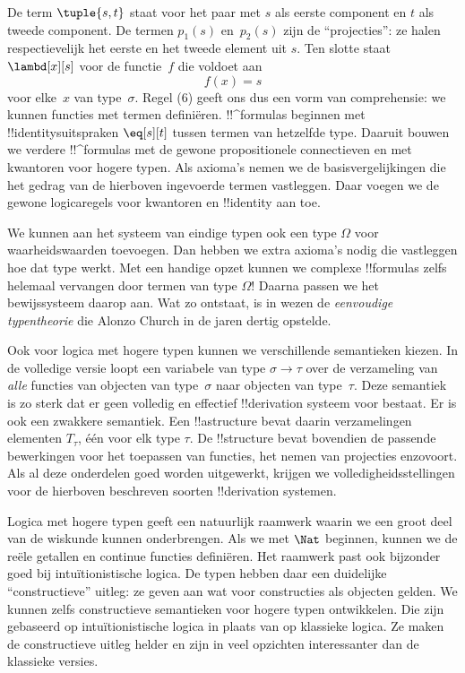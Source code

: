 \documentclass[../../../include/open-logic-section]{subfiles}
\begin{document}
De term $\tuple{s, t}$ staat voor het paar met $s$ als eerste component en
$t$ als tweede component. De termen $p_1(s)$ en~$p_2(s)$ zijn de
``projecties'': ze halen respectievelijk het eerste en het tweede element uit
$s$. Ten slotte staat $\lambd[x][s]$ voor de functie~$f$ die voldoet aan
\[
f(x) = s
\]
voor elke~$x$ van type~$\sigma$. Regel (6) geeft ons dus een vorm van
comprehensie: we kunnen functies met termen definiëren. !!^{formula}s beginnen
met !!{identity}suitspraken $\eq[s][t]$ tussen termen van hetzelfde type.
Daaruit bouwen we verdere !!^{formula}s met de gewone propositionele
connectieven en met kwantoren voor hogere typen. Als axioma's nemen we de
basisvergelijkingen die het gedrag van de hierboven ingevoerde termen
vastleggen. Daar voegen we de gewone logicaregels voor kwantoren en
!!{identity} aan toe.

We kunnen aan het systeem van eindige typen ook een type $\Omega$ voor
waarheidswaarden toevoegen. Dan hebben we extra axioma's nodig die vastleggen
hoe dat type werkt. Met een handige opzet kunnen we complexe !!{formula}s
zelfs helemaal vervangen door termen van type $\Omega$!{} Daarna passen we het
bewijssysteem daarop aan. Wat zo ontstaat, is in wezen de
\emph{eenvoudige typentheorie} die Alonzo Church in de jaren dertig opstelde.

Ook voor logica met hogere typen kunnen we verschillende semantieken kiezen.
In de volledige versie loopt een variabele van type $\sigma \to \tau$ over
de verzameling van
\emph{alle} functies van objecten van type~$\sigma$ naar objecten van
type~$\tau$. Deze semantiek is zo sterk dat er geen volledig en effectief
!!{derivation} systeem voor bestaat. Er is ook een zwakkere semantiek. Een
!!a{structure} bevat daarin verzamelingen elementen $T_\tau$, één voor elk
type $\tau$. De !!{structure} bevat bovendien de passende bewerkingen voor het
toepassen van functies, het nemen van projecties enzovoort. Als al deze
onderdelen goed worden uitgewerkt, krijgen we volledigheidsstellingen voor de
hierboven beschreven soorten !!{derivation} systemen.

Logica met hogere typen geeft een natuurlijk raamwerk waarin we een groot deel
van de wiskunde kunnen onderbrengen. Als we met $\Nat$ beginnen, kunnen we de
reële getallen en continue functies definiëren. Het raamwerk
past ook bijzonder goed bij intuïtionistische logica. De typen hebben daar een
duidelijke ``constructieve'' uitleg: ze geven aan wat voor constructies als
objecten gelden. We kunnen zelfs constructieve semantieken voor hogere typen
ontwikkelen. Die zijn gebaseerd op intuïtionistische logica in plaats van op
klassieke logica. Ze maken de constructieve uitleg helder en zijn in veel
opzichten interessanter dan de klassieke versies.
\end{document}
